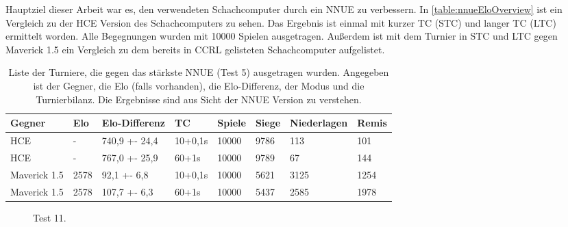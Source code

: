Hauptziel dieser Arbeit war es, den verwendeten Schachcomputer durch ein \ac{NNUE} zu verbessern. In \autoref{table:nnueEloOverview} ist ein Vergleich zu der \ac{HCE} Version des Schachcomputers zu sehen. Das Ergebnis ist einmal mit kurzer \ac{TC} (\ac{STC}) und langer \ac{TC} (\ac{LTC}) ermittelt worden. Alle Begegnungen wurden mit 10000 Spielen ausgetragen. Außerdem ist mit dem Turnier in \ac{STC} und \ac{LTC} gegen Maverick 1.5 ein Vergleich zu dem bereits in \ac{CCRL} \cite{CCRL} gelisteten Schachcomputer aufgelistet.

\begin{table}[ht]
  \caption{Liste der Turniere, die gegen das stärkste \ac{NNUE} (Test 5) ausgetragen wurden. Angegeben ist der Gegner, die Elo (falls vorhanden), die Elo-Differenz, der Modus und die Turnierbilanz. Die Ergebnisse sind aus Sicht der \ac{NNUE} Version zu verstehen.}
  \label{table:nnueEloOverview}
  \renewcommand{\arraystretch}{1.2}
  \centering
  \sffamily
  \begin{footnotesize}
    \begin{tabular}{l l l l l l l l}
      \toprule
      \textbf{Gegner} & \textbf{Elo} & \textbf{Elo-Differenz} & \textbf{\ac{TC}} & \textbf{Spiele} & \textbf{Siege} & \textbf{Niederlagen} & \textbf{Remis} \\
      \midrule
      HCE             & -            & 740,9 +- 24,4         & 10+0,1s          & 10000           & 9786           & 113                  & 101            \\
      HCE             & -            & 767,0 +- 25,9         & 60+1s            & 10000           & 9789           & 67                   & 144            \\
      Maverick 1.5    & 2578         & 92,1  +- 6,8           & 10+0,1s          & 10000           & 5621           & 3125                 & 1254           \\
      Maverick 1.5    & 2578         & 107,7 +- 6,3          & 60+1s            & 10000           & 5437           & 2585                 & 1978           \\
      \bottomrule
    \end{tabular}
  \end{footnotesize}
  \rmfamily
\end{table}

\begin{figure}
  \centering
  \caption{Test 11.}
  \label{fig:test2_4}
\end{figure}

